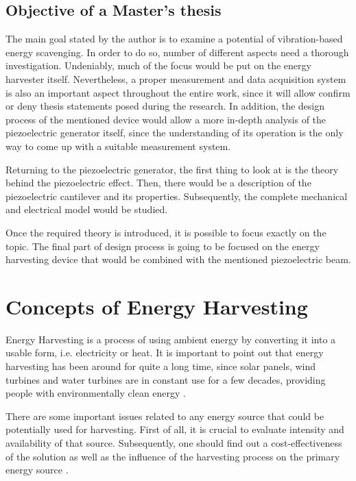 \documentclass[12pt,a4paper]{article}
\begin{document}
\subsection{Objective of a Master's thesis}
The main goal stated by the author is to examine a potential of vibration-based energy scavenging. In order to do so, number of different aspects need a thorough investigation. Undeniably, much of the focus would be put on the energy harvester itself. Nevertheless, a proper measurement and data acquisition system is also an important aspect throughout the entire work, since it will allow confirm or deny thesis statements posed during the research. In addition, the design process of the mentioned device would allow a more in-depth analysis of the piezoelectric generator itself, since the understanding of its operation is the only way to come up with a suitable measurement system.
\par
Returning to the piezoelectric generator, the first thing to look at is the theory behind the piezoelectric effect. Then, there would be a description of the piezoelectric cantilever  and its properties. Subsequently, the complete mechanical and electrical model would be studied.
\par

Once the required theory is introduced, it is possible to focus exactly on the topic. The final part of design process is going to be focused on the energy harvesting device that would be combined with the mentioned piezoelectric beam.


\FloatBarrier

\section{Concepts of Energy Harvesting}
Energy Harvesting is a process of using ambient energy by converting it into a usable form, i.e. electricity or heat. It is important to point out that energy harvesting has been around for quite a long time, since solar panels, wind turbines and water turbines are in constant use for a few decades, providing people with environmentally clean energy \cite{EnHv1}.
\par

There are some important issues related to any energy source that could be potentially used for harvesting. First of all, it is crucial to evaluate intensity and availability of that source. Subsequently, one should find out a cost-effectiveness of the solution as well as the influence of the harvesting process on the primary energy source \cite{EnHv1}.
\par
\end{document}
